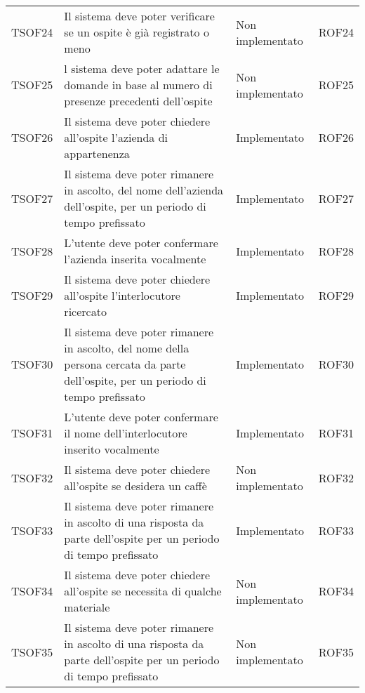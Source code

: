 \documentclass[../PianoDiQualifica_v3.0.0.tex]{subfiles}
\begin{document}
\begin{longtable}[c] { >{\centering\arraybackslash}p{2cm} p{7cm} >{\centering\arraybackslash}p{4cm} >{\centering\arraybackslash}p{2cm}}
			\addlinespace[0.3em]
			\midrule
			\addlinespace[0.3em]
			TSOF24 & Il sistema deve poter verificare se un ospite è già registrato o meno & Non implementato & ROF24\\
			\addlinespace[0.3em]
			\midrule
			\addlinespace[0.3em]
			TSOF25 & l sistema deve poter adattare le domande in base al numero di presenze precedenti dell'ospite & Non implementato & ROF25 \\
			\addlinespace[0.3em]
			\midrule
			\addlinespace[0.3em]
			TSOF26 & Il sistema deve poter chiedere all'ospite l'azienda di appartenenza & Implementato & ROF26 \\
			\addlinespace[0.3em]
			\midrule
			\addlinespace[0.3em]
			TSOF27 & Il sistema deve poter rimanere in ascolto, del nome dell'azienda dell'ospite, per un periodo di tempo prefissato & Implementato & ROF27 \\
			\addlinespace[0.3em]
			\midrule
			\addlinespace[0.3em]
			TSOF28 & L'utente deve poter confermare l'azienda inserita vocalmente & Implementato & ROF28 \\
			\addlinespace[0.3em]
			\midrule
			\addlinespace[0.3em]
			TSOF29 & Il sistema deve poter chiedere all'ospite l'interlocutore ricercato & Implementato & ROF29 \\
			\addlinespace[0.3em]
			\midrule
			\addlinespace[0.3em]
			TSOF30 & Il sistema deve poter rimanere in ascolto, del nome della persona cercata da parte dell'ospite, per un periodo di tempo prefissato & Implementato & ROF30 \\
			\addlinespace[0.3em]
			\midrule
			\addlinespace[0.3em]
			TSOF31 & L'utente deve poter confermare il nome dell’interlocutore inserito vocalmente & Implementato & ROF31 \\
			\addlinespace[0.3em]
			\midrule
			\addlinespace[0.3em]
			TSOF32 & Il sistema deve poter chiedere all'ospite se desidera un caffè & Non implementato & ROF32 \\
			\addlinespace[0.3em]
			\midrule
			\addlinespace[0.3em]
			TSOF33 & Il sistema deve poter rimanere in ascolto di una risposta da parte dell'ospite per un periodo di tempo prefissato	 & Implementato & ROF33 \\
			\addlinespace[0.3em]
			\midrule
			\addlinespace[0.3em]
			TSOF34 & Il sistema deve poter chiedere all'ospite se necessita di qualche materiale & Non implementato & ROF34 \\
			\addlinespace[0.3em]
			\midrule
			\addlinespace[0.3em]
			TSOF35 & Il sistema deve poter rimanere in ascolto di una risposta da parte dell'ospite per un periodo di tempo prefissato & Non implementato & ROF35 \\

\end{longtable}
\end{document}
